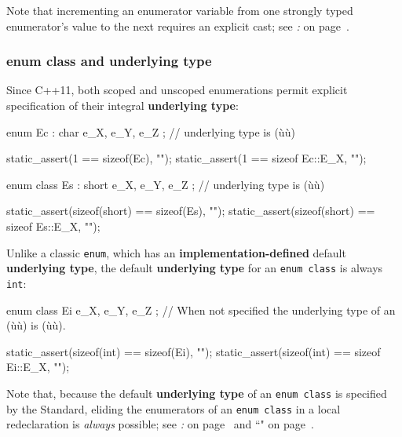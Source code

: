 \noindent Note that incrementing an enumerator variable from one strongly typed
enumerator's value to the next requires an explicit cast; see \textit{: } on page~\pageref{strong-typing-of-an-enum-class-can-be-counterproductive}.

\subsubsection[{\tt enum} {\tt class} and underlying type]{{\SubsubsecCode enum} {\SubsubsecCode class} and underlying type}\label{enum-class-and-underlying-type}

Since C++11, both scoped and unscoped enumerations permit explicit
specification of their integral \textbf{underlying type}:

\begin{emcppslisting}
enum Ec : char { e_X, e_Y, e_Z };
    // underlying type is (ù{}ù)

static_assert(1 == sizeof(Ec),     "");
static_assert(1 == sizeof Ec::E_X, "");

enum class Es : short { e_X, e_Y, e_Z };
    // underlying type is (ù{}ù)

static_assert(sizeof(short) == sizeof(Es),     "");
static_assert(sizeof(short) == sizeof Es::E_X, "");
\end{emcppslisting}

\noindent Unlike a classic \texttt{enum}, which has an
\textbf{implementation-defined} default \textbf{underlying type}, the
default \textbf{underlying type} for an \texttt{enum}~\texttt{class} is
always \texttt{int}:

\begin{emcppslisting}
enum class Ei { e_X, e_Y, e_Z };
    // When not specified the underlying type of an (ù{}ù) is (ù{}ù).

static_assert(sizeof(int) == sizeof(Ei),     "");
static_assert(sizeof(int) == sizeof Ei::E_X, "");
\end{emcppslisting}

\noindent Note that, because the default \textbf{underlying type} of an
\texttt{enum}~\texttt{class} is specified by the Standard, eliding the
enumerators of an \texttt{enum}~\texttt{class} in
a local redeclaration is \emph{always} possible; see
\textit{: } on page~\pageref{external-use-of-opaque-enumerators-enumclass} and ``" on page~\pageref{enumopaque}.

